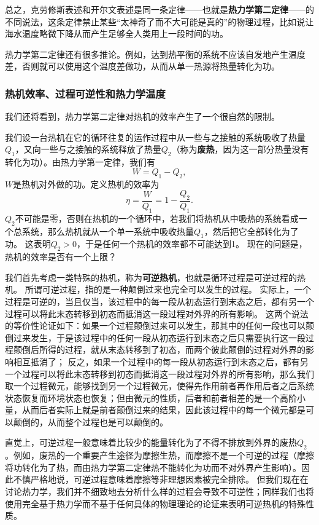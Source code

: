 \documentclass[hyperref, UTF8, a4paper]{ctexart}
\begin{document}
总之，克劳修斯表述和开尔文表述是同一条定律——也就是\textbf{热力学第二定律}——的不同说法，这条定律禁止某些“太神奇了而不大可能是真的”的物理过程，比如说让海水温度略微下降从而产生足够全人类用上一段时间的功。

热力学第二定律还有很多推论。例如，达到热平衡的系统不应该自发地产生温度差，否则就可以使用这个温度差做功，从而从单一热源将热量转化为功。

\subsubsection{热机效率、过程可逆性和热力学温度}

我们还将看到，热力学第二定律对热机的效率产生了一个很自然的限制。

我们设一台热机在它的循环往复的运作过程中从一些与之接触的系统吸收了热量$Q_1$，又向一些与之接触的系统释放了热量$Q_2$（称为\textbf{废热}，因为这一部分热量没有转化为功）。由热力学第一定律，我们有
\begin{equation}
    W = Q_1 - Q_2,
\end{equation}
$W$是热机对外做的功。定义热机的效率为
\begin{equation}
    \eta = \frac{W}{Q_1} = 1 - \frac{Q_2}{Q_1}.
    \label{eq:heat-efficienty}
\end{equation}
$Q_2$不可能是零，否则在热机的一个循环中，若我们将热机从中吸热的系统看成一个总系统，那么热机就从一个单一系统中吸收热量$Q_1$，然后把它全部转化为了功。
这表明$Q_2>0$，于是任何一个热机的效率都不可能达到1。
现在的问题是，热机的效率是否有一个上限？

我们首先考虑一类特殊的热机，称为\textbf{可逆热机}，也就是循环过程是可逆过程的热机。
所谓可逆过程，指的是一种颠倒过来也完全可以发生的过程。
实际上，一个过程是可逆的，当且仅当，该过程中的每一段从初态运行到末态之后，都有另一个过程可以将此末态转移到初态而抵消这一段过程对外界的所有影响。
这两个说法的等价性论证如下：如果一个过程颠倒过来可以发生，那其中的任何一段也可以颠倒过来发生，于是该过程中的任何一段从初态运行到末态之后只需要执行这一段过程颠倒后所得的过程，就从末态转移到了初态，而两个彼此颠倒的过程对外界的影响相互抵消了；
反之，如果一个过程中的每一段从初态运行到末态之后，都有另一个过程可以将此末态转移到初态而抵消这一段过程对外界的所有影响，那么我们取一个过程微元，能够找到另一个过程微元，使得先作用前者再作用后者之后系统状态恢复而环境状态也恢复；但由微元的性质，后者和前者相差的是一个高阶小量，从而后者实际上就是前者颠倒过来的结果，因此该过程中的每一个微元都是可以颠倒的，从而整个过程也是可以颠倒的。

直觉上，可逆过程一般意味着比较少的能量转化为了不得不排放到外界的废热$Q_2$。例如，废热的一个重要产生途径为摩擦生热，而摩擦不是一个可逆的过程（摩擦将功转化为了热，而由热力学第二定律热不能转化为功而不对外界产生影响）。因此不慎严格地说，可逆过程意味着摩擦等非理想因素被完全排除。
但我们现在在讨论热力学，我们并不细致地去分析什么样的过程会导致不可逆性；同样我们也将使用完全基于热力学而不基于任何具体的物理理论的论证来表明可逆热机的特殊性质。
\end{document}
